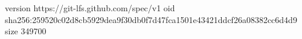 version https://git-lfs.github.com/spec/v1
oid sha256:259520c02d8cb5929dea9f30db0f7d47fca1501e43421ddcf26a08382cc6d4d9
size 349700
